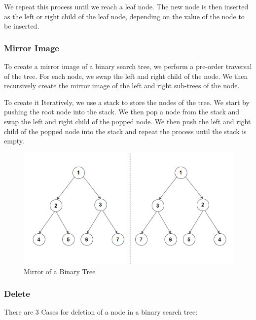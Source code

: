 \documentclass[11pt]{article}
\begin{document}
We repeat this process until we reach a leaf node. The new node is then inserted as the left or right child of the leaf node, depending on the value of the node to be inserted.
\subsubsection{Mirror Image}

To create a mirror image of a binary search tree, we perform a pre-order traversal of the tree. For each node, we swap the left and right child of the node. We then recursively create the mirror image of the left and right sub-trees of the node.

To create it Iteratively, we use a stack to store the nodes of the tree. We start by pushing the root node into the stack. We then pop a node from the stack and swap the left and right child of the popped node. We then push the left and right child of the popped node into the stack and repeat the process until the stack is empty.

\begin{figure}[H]
	\centering
	\includegraphics[scale=0.5]{figures/Binary-Tree-Mirror.png}
	\caption{Mirror of a Binary Tree}
	\label{fig:Mirror of a Binary Tree}
\end{figure}


\subsubsection{Delete}

There are 3 Cases for deletion of a node in a binary search tree:
\end{document}
